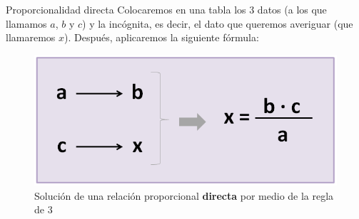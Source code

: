 \begin{infocard}{Proporcionalidad directa}
    Colocaremos en una tabla los 3 datos (a los que llamamos $a$, $b$ y $c$) y la incógnita, es decir, el dato que queremos averiguar (que llamaremos $x$). Después, aplicaremos la siguiente fórmula:
    \begin{figure}[H]
        \centering
        \includegraphics[width=.75\linewidth]{../images/formula-regla-de-3-img1}
        \caption{Solución de una relación proporcional \textbf{directa} por medio de la regla de 3}
        \label{fig:}
    \end{figure}
\end{infocard}

